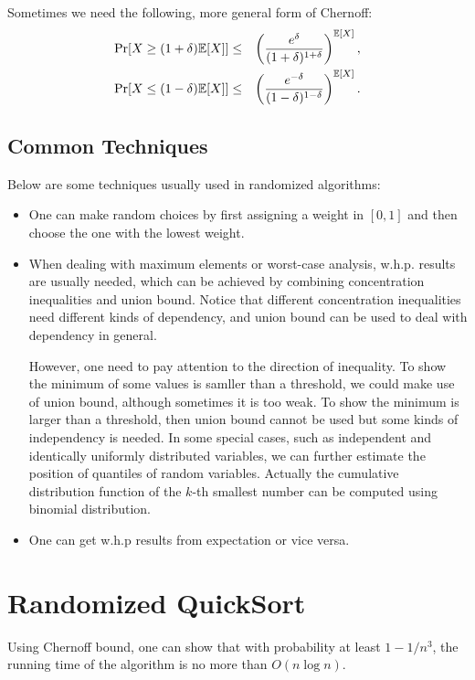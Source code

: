 \documentclass[openany]{book}
\begin{document}
\begin{itemize}
    Sometimes we need the following, more general form of Chernoff:
    \begin{eqnarray}
        \mathrm{Pr}[X\ge(1+\delta)\mathbb{E}[X]] & \le & \left(\frac{e^{\delta}}{(1+\delta)^{1+\delta}}\right)^{\mathbb{E}[X]}, \\ \mathrm{Pr}[X\le(1-\delta)\mathbb{E}[X]] & \le & \left(\frac{e^{-\delta}}{(1-\delta)^{1-\delta}}\right)^{\mathbb{E}[X]}.
    \end{eqnarray}
\end{itemize}

\subsection{Common Techniques}
Below are some techniques usually used in randomized algorithms:
\begin{itemize}
\item One can make random choices by first assigning a weight in $[0,1]$ and then choose the one with the lowest weight.

\item  When dealing with maximum elements or worst-case analysis, w.h.p. results are usually needed, which can be achieved by combining concentration inequalities and union bound. Notice that different concentration inequalities need different kinds of dependency, and union bound can be used to deal with dependency in general.

However, one need to pay attention to the direction of inequality. To show the minimum of some values is samller than a threshold, we could make use of union bound, although sometimes it is too weak. To show the minimum is larger than a threshold, then union bound cannot be used but some kinds of independency is needed. In some special cases, such as independent and identically uniformly distributed variables, we can further estimate the position of quantiles of random variables. Actually the cumulative distribution function of the $k$-th smallest number can be computed using binomial distribution.

\item One can get w.h.p results from expectation or vice versa.
\end{itemize}

\section{Randomized QuickSort}
Using Chernoff bound, one can show that with probability at least $1-1/n^3$, the running time of the algorithm is no more than $O(n\log n)$.
\end{document}
